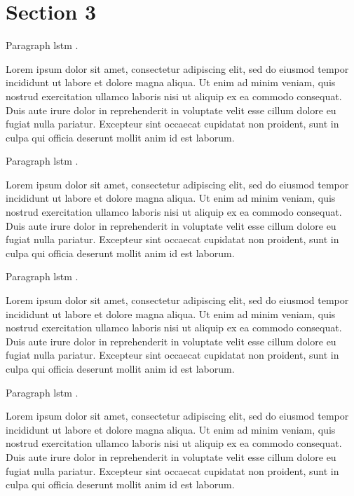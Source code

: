 \section{Section 3}

Paragraph
\gls{lstm} \cite{hochreiter1997lstm-1}
\cite{zeyer2018:asr-attention-1}.

Lorem ipsum dolor sit amet, consectetur adipiscing elit,
sed do eiusmod tempor incididunt ut labore et dolore magna aliqua.
Ut enim ad minim veniam, quis nostrud exercitation ullamco laboris nisi ut aliquip ex ea commodo consequat.
Duis aute irure dolor in reprehenderit in voluptate velit esse cillum dolore eu fugiat nulla pariatur.
Excepteur sint occaecat cupidatat non proident, sunt in culpa qui officia deserunt mollit anim id est laborum.

Paragraph
\gls{lstm} \cite{hochreiter1997lstm-2}
\cite{zeyer2018:asr-attention-2}.

Lorem ipsum dolor sit amet, consectetur adipiscing elit,
sed do eiusmod tempor incididunt ut labore et dolore magna aliqua.
Ut enim ad minim veniam, quis nostrud exercitation ullamco laboris nisi ut aliquip ex ea commodo consequat.
Duis aute irure dolor in reprehenderit in voluptate velit esse cillum dolore eu fugiat nulla pariatur.
Excepteur sint occaecat cupidatat non proident, sunt in culpa qui officia deserunt mollit anim id est laborum.

Paragraph
\gls{lstm} \cite{hochreiter1997lstm-3}
\cite{zeyer2018:asr-attention-3}.

Lorem ipsum dolor sit amet, consectetur adipiscing elit,
sed do eiusmod tempor incididunt ut labore et dolore magna aliqua.
Ut enim ad minim veniam, quis nostrud exercitation ullamco laboris nisi ut aliquip ex ea commodo consequat.
Duis aute irure dolor in reprehenderit in voluptate velit esse cillum dolore eu fugiat nulla pariatur.
Excepteur sint occaecat cupidatat non proident, sunt in culpa qui officia deserunt mollit anim id est laborum.

Paragraph
\gls{lstm} \cite{hochreiter1997lstm-4}
\cite{zeyer2018:asr-attention-4}.

Lorem ipsum dolor sit amet, consectetur adipiscing elit,
sed do eiusmod tempor incididunt ut labore et dolore magna aliqua.
Ut enim ad minim veniam, quis nostrud exercitation ullamco laboris nisi ut aliquip ex ea commodo consequat.
Duis aute irure dolor in reprehenderit in voluptate velit esse cillum dolore eu fugiat nulla pariatur.
Excepteur sint occaecat cupidatat non proident, sunt in culpa qui officia deserunt mollit anim id est laborum.

